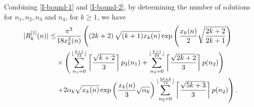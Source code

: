 \documentclass[12pt]{article}
\numberwithin{equation}{section}
\begin{document}
Combining \eqref{I-bound-1} and \eqref{I-bound-2}, by determining the number of solutions for $n_1,n_2,n_3$ and $n_4$, for $k\geq1$, we have
\begin{align}\label{R1-bound}
|R_{k}^{[1]}(n)|
\leq& \frac{\pi^3}{18 {x^2_{k}(n)}}\left(\left(2k+2\right)
\sqrt{(k+1)x_k(n)}
\exp \left( \frac{x_{k}(n)}{2}\sqrt{\frac{2k+2}{2k+1}} \right)
\right.
\notag\\
&\times\Bigg(\sum_{n_1=0}^{\lfloor\frac{k+1}{12}\rfloor}
\left\lceil\frac{\sqrt{k+2}}{3}\right\rceil p_3(n_1)+\sum_{n_2=0}^{\lfloor\frac{k+1}{24}\rfloor}
\left\lceil\frac{\sqrt{2k+2}}{3}\right\rceil p(n_2)\Bigg)
\notag\\
&\left.+ 2\alpha_k\sqrt{x_{k}(n)}
\exp \left( \frac{x_{k}(n)}{3} \sqrt{\alpha_k} \right)
\sum_{n_2=0}^{\lfloor\frac{5k+2}{12}\rfloor}
\left\lceil\frac{\sqrt{5k +3}}{3}\right\rceil p(n_2)
\right).
\end{align}
\end{document}
